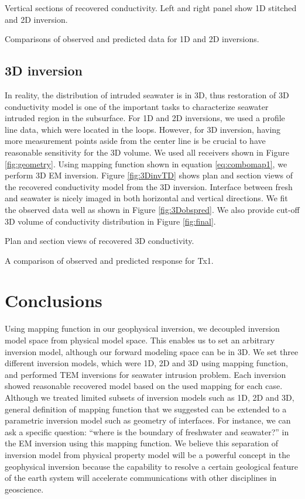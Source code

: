 \documentclass{segabs}
\begin{document}
{Vertical sections of recovered conductivity. Left and right panel show 1D stitched and 2D inversion.}

{Comparisons of observed and predicted data for 1D and 2D inversions. }

\subsection*{3D inversion}
In reality, the distribution of intruded seawater is in 3D, thus restoration of 3D conductivity model is one of the important tasks to characterize seawater intruded region in the subsurface. For 1D and 2D inversions, we used a profile line data, which were located in the loops. However, for 3D inversion, having more measurement points aside from the center line is be crucial to have reasonable sensitivity for the 3D volume. We used all receivers shown in Figure \ref{fig:geometry}. Using mapping function shown in equation \ref{eq:combomap1}, we perform 3D EM inversion. Figure \ref{fig:3DinvTD} shows plan and section views of the recovered conductivity model from the 3D inversion. Interface between fresh and seawater is nicely imaged in both horizontal and vertical directions. We fit the observed data well as shown in Figure \ref{fig:3Dobspred}. We also provide cut-off 3D volume of conductivity distribution in Figure \ref{fig:final}.

{Plan and section views of recovered 3D conductivity.}

{A comparison of observed and predicted response for Tx1.}

\section*{Conclusions}
Using mapping function in our geophysical inversion, we decoupled inversion model space from physical model space. This enables us to set an arbitrary inversion model, although our forward modeling space can be in 3D. We set three different inversion models, which were 1D, 2D and 3D using mapping function, and performed TEM inversions for seawater intrusion problem. Each inversion showed reasonable recovered model based on the used mapping for each case. Although we treated limited subsets of inversion models such as 1D, 2D and 3D, general definition of mapping function that we suggested can be extended to a parametric inversion model such as geometry of interfaces. For instance, we can ask a specific question: ``where is the boundary of freshwater and seawater?'' in the EM inversion using this mapping function. We believe this separation of inversion model from physical property model will be a powerful concept in the geophysical inversion because the capability to resolve a certain geological feature of the earth system  will accelerate communications with other disciplines in geoscience.
\end{document}

